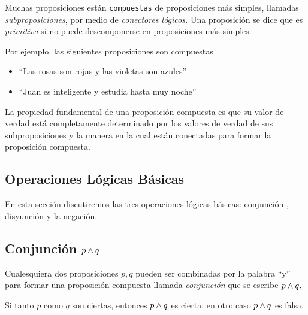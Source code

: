     Muchas proposiciones están \texttt{compuestas} de proposiciones más simples, llamadas \emph{subproposiciones}, por medio de \emph{conectores lógicos.}  Una proposición se dice que es \emph{primitiva} si no puede descomponerse en proposiciones más simples.



    Por ejemplo, las siguientes proposiciones son compuestas
    \begin{itemize}
        \item ``Las rosas son rojas y las violetas son azules''
        \item ``Juan es inteligente y estudia hasta muy noche''
    \end{itemize}
    



    La propiedad fundamental de una proposición compuesta es que su valor de verdad está completamente determinado por los valores de verdad de sus subproposiciones y la manera en la cual están conectadas para formar la proposición compuesta. 


\subsection{Operaciones Lógicas Básicas}


    En esta sección discutiremos las tres operaciones lógicas básicas: conjunción , disyunción  y la negación.


\subsection{Conjunción $p \wedge q$}


    Cualesquiera dos proposiciones $p,q$ pueden ser combinadas por la palabra ``y'' para formar una proposición compuesta llamada \emph{conjunción} que se escribe $p\wedge q.$



    \begin{defn}
        Si tanto $p$ como $q$ son ciertas, entonces $p \wedge q$ es cierta; en otro caso $p\wedge q$ es falsa.
    \end{defn}	

